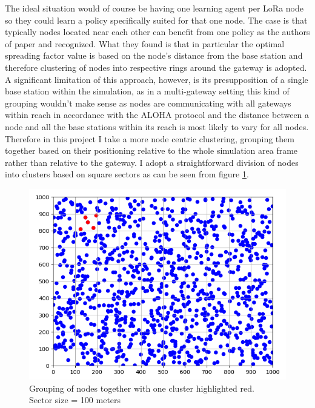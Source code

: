 The ideal situation would of course be having one learning agent
per LoRa node so they could learn a policy specifically suited for that one node. The case is that typically nodes located 
near each other can benefit from one policy as the authors of paper
\cite{rl_lora_original} and \cite{rl_distributed_mab} recognized.
What they found is that in particular the optimal spreading factor value is based on
the node's distance from the base station and therefore clustering of 
nodes into respective rings around the gateway is adopted. A significant 
limitation of this approach, however, is its presupposition of a single 
base station within the simulation, as in a multi-gateway setting 
this kind of grouping wouldn't make sense as nodes are communicating 
with all gateways within reach in accordance with the ALOHA protocol
and the distance between a node and all the base stations within its 
reach is most likely to vary for all nodes. Therefore in this project
I take a more node centric clustering, grouping them together based
on their positioning relative to the whole simulation area frame rather
than relative to the gateway. I adopt a straightforward division of 
nodes into clusters based on square sectors as can be seen from figure 
\ref{fig:my_sectors}.


\begin{figure}[H]
\centering
\includegraphics[scale=0.7]{figures/my_sectors.PNG}
  \caption{Grouping of nodes together with one cluster highlighted red. \\ Sector size = 100 meters}
  \label{fig:my_sectors}
\end{figure}

